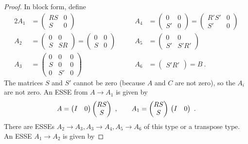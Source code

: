 \documentclass{amsart}
\theoremstyle{definition}
\theoremstyle{remark}
\numberwithin{equation}{section}
\begin{document}
{{\begin{proof} 
In block form, define 
\begin{alignat*}{2} 
A_1 &=  \begin{pmatrix} RS & 0 \\ S & 0 \end{pmatrix} 
& 
A_4 &=  \begin{pmatrix} 0 & 0 \\ S' & 0 \end{pmatrix} 
= \begin{pmatrix} R'S' & 0 \\ S' & 0 \end{pmatrix} \\ 
A_2 &=  \begin{pmatrix} 0 & 0 \\ S & SR \end{pmatrix} 
=  \begin{pmatrix} 0 & 0 \\ S & 0 \end{pmatrix} \qquad 
&
A_5 &=  \begin{pmatrix} 0 & 0 \\ S' & S'R'  \end{pmatrix} \\ 
A_3 &=  \begin{pmatrix} 
0 & 0 & 0 \\ S & 0 & 0 \\ 0 & S' & 0 \end{pmatrix} 
&
A_6 & =  \begin{pmatrix} S'R' \end{pmatrix} = B \ . 
\end{alignat*}
The matrices $S$ and $S'$ cannot be zero (because $A$ and $C$ 
are not zero), so the $A_i$ are not zero. An ESSE from 
$A\to A_1$ is given by 
\[ 
A  = 
  \begin{pmatrix} I & 0  \end{pmatrix} 
 \begin{pmatrix} RS  \\ S  \end{pmatrix} 
\ , \qquad 
A_1 =  
 \begin{pmatrix} RS  \\ S  \end{pmatrix} \\ 
  \begin{pmatrix} I & 0  \end{pmatrix}  \ . 
\] 
There are ESSEs $A_2\to A_3, A_3\to A_4, A_5\to A_6$ of this 
type or a transpose type. 
An ESSE $A_1\to A_2$ is given by 

\end{proof}}}
\end{document}
